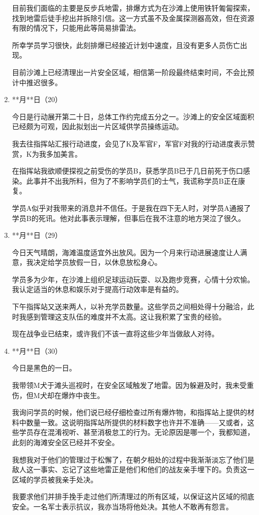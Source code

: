 \begin{enumerate}
目前我们面临的主要是反步兵地雷，排爆方式为在沙滩上使用铁钎匍匐探索，找到地雷后徒手挖出并拆除引信。这一方式虽不及金属探测器高效，但在资源有限的情况下，只能用此等简易排雷法。

所幸学员学习很快，此刻排爆已经接近计划中速度，且没有更多人员伤亡出现。

目前沙滩上已经清理出一片安全区域，相信第一阶段最终结束时间，不会比预计中推迟很多。
    \item **月**日（20）
    
今日是行动展开第二十日，总体工作约完成五分之一。沙滩上的安全区域面积已经颇为可观，因此拟划出一片区域供学员操练运动。

我去往指挥站汇报行动进度，会见了K及军官F，军官F对我的行动进度表示赞赏，K为我多加美言。

在指挥站我欲顺便探视之前受伤的学员B，获悉学员B已于几日前死于伤口感染。此事并不出我所料，但为了不影响学员们的士气，我谎称学员B正在康复。

学员A似乎对我带来的消息并不信任。于是我在四下无人时，对学员A通报了学员B的死讯。他对此事表示理解，但事后在我不注意的地方哭泣了很久。
    \item **月**日（29）
    
今日天气晴朗，海滩温度适宜外出放风。因为一个月来行动进展速度让人满意，我决定给学员放假一日，以休息放松身心。

学员多为少年，在沙滩上组织足球运动玩耍、以及跑步竞赛，心情十分欢愉。我认定适当的休息和娱乐对于提高行动效率是有益的。

下午指挥站又送来两人，以补充学员数量。这些学员之间相处得十分融洽，此时我感到管理这支队伍的难度并不太高。这让我积累了宝贵的经验。

现在战争业已结束，或许我们不该一直将这些少年当做敌人对待。
    \item **月**日（30）
    
今日是黑色的一日。

我带领M犬于滩头巡视时，在安全区域触发了地雷。因为躲避及时，我未受重伤，但M犬却在爆炸中丧生。

我询问学员的时候，他们说已经仔细检查过所有爆炸物，和指挥站上提供的材料中数量一致。这说明指挥站所提供的材料数字也许并不准确——又或者，这些学员存在混淆视听、甚至消极怠工的行为。无论原因是哪一个，我都知道，此刻的海滩安全区已经并不安全。

我想我对于他们的管理过于松懈了，在朝夕相处的过程中我渐渐淡忘了他们是敌人这一事实、忘记了这些地雷正是他们和他们的战友亲手埋下的。负责这一区域的学员被我亲手处决。

我要求他们并排手挽手走过他们所清理过的所有区域，以保证这片区域的彻底安全。一名军士表示抗议，我亦当场将他处决。其他人不敢再有怨言。


\end{enumerate}
